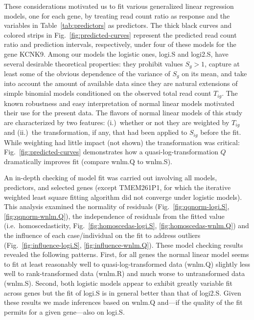 \documentclass[letterpaper]{article}
\begin{document}
These considerations motivated us to fit various generalized linear regression
models, one for each gene, by treating read count ratio as response and the
variables in Table~\ref{tab:predictors} as predictors. The thick black curves
and colored strips in Fig.~\ref{fig:predicted-curves} represent the predicted
read count ratio and prediction intervals, respectively, under four of these
models for the gene KCNK9.  Among our models the logistic ones, logi.S and
logi2.S, have several desirable theoretical properties: they prohibit values
\(S_{g}>1\), capture at least some of the obvious dependence of the variance
of \(S_{g}\) on its mean, and take into account the amount of available data
since they are natural extensions of simple binomial models conditioned on the
observed total read count \(T_{ig}\).  The known robustness and easy
interpretation of normal linear models motivated their use for the
present data.  The flavors of normal linear models of this study are
characterized by two features: (i.)~whether or not they are weighted by
\(T_{ig}\) and (ii.)~the transformation, if any, that had been applied to
\(S_{ig}\) before the fit.  While weighting had little impact (not shown) the
transformation was critical: Fig.~\ref{fig:predicted-curves} demonstrates how
a quasi-log-transformation \(Q\) dramatically improves fit (compare wnlm.Q to
wnlm.S).

An in-depth checking of model fit was carried out involving all models,
predictors, and selected genes (except TMEM261P1, for which the iterative
weighted least square fitting algorithm did not converge under logistic
models).  This analysis examined the normality of residuals
(Fig.~\ref{fig:qqnorm-logi.S},
\ref{fig:qqnorm-wnlm.Q}),
the independence of residuals from the fitted value (i.e.~homoscedasticity,
Fig.~\ref{fig:homoscedas-logi.S},
\ref{fig:homoscedas-wnlm.Q})
and the influence of each case/individual on the
fit to address outliers (Fig.~\ref{fig:influence-logi.S},
\ref{fig:influence-wnlm.Q}).  These model
checking results revealed the following patterns.  First, for all genes the
normal linear model seems to fit at
least reasonably well to quasi-log-transformed data (wnlm.Q) slightly less
well to rank-transformed data (wnlm.R) and much worse to untransformed data
(wnlm.S).  Second, both logistic models appear to exhibit greatly variable
fit across genes but the fit of logi.S is in general better than that of
logi2.S.  Given these results we made inferences based on wnlm.Q and---if the
quality of the fit permits for a given gene---also on logi.S.
\end{document}
